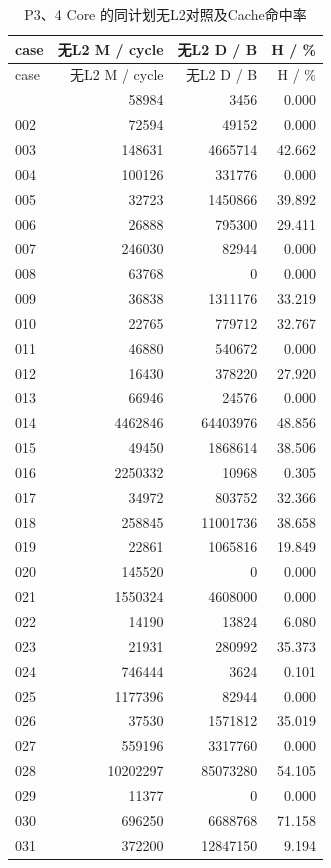 \documentclass[anonymous,notoc]{gmcm2026}
\begin{document}
\begin{longtable}{lrrr}
\caption{P3、4 Core 的同计划无L2对照及Cache命中率}\\
\toprule
case & 无L2 M / cycle & 无L2 D / B & H / \%\\\midrule
\endfirsthead
\toprule
case & 无L2 M / cycle & 无L2 D / B & H / \%\\\midrule
\endhead
\bottomrule\endfoot
001 & 58984 & 3456 & 0.000 \\
002 & 72594 & 49152 & 0.000 \\
003 & 148631 & 4665714 & 42.662 \\
004 & 100126 & 331776 & 0.000 \\
005 & 32723 & 1450866 & 39.892 \\
006 & 26888 & 795300 & 29.411 \\
007 & 246030 & 82944 & 0.000 \\
008 & 63768 & 0 & 0.000 \\
009 & 36838 & 1311176 & 33.219 \\
010 & 22765 & 779712 & 32.767 \\
011 & 46880 & 540672 & 0.000 \\
012 & 16430 & 378220 & 27.920 \\
013 & 66946 & 24576 & 0.000 \\
014 & 4462846 & 64403976 & 48.856 \\
015 & 49450 & 1868614 & 38.506 \\
016 & 2250332 & 10968 & 0.305 \\
017 & 34972 & 803752 & 32.366 \\
018 & 258845 & 11001736 & 38.658 \\
019 & 22861 & 1065816 & 19.849 \\
020 & 145520 & 0 & 0.000 \\
021 & 1550324 & 4608000 & 0.000 \\
022 & 14190 & 13824 & 6.080 \\
023 & 21931 & 280992 & 35.373 \\
024 & 746444 & 3624 & 0.101 \\
025 & 1177396 & 82944 & 0.000 \\
026 & 37530 & 1571812 & 35.019 \\
027 & 559196 & 3317760 & 0.000 \\
028 & 10202297 & 85073280 & 54.105 \\
029 & 11377 & 0 & 0.000 \\
030 & 696250 & 6688768 & 71.158 \\
031 & 372200 & 12847150 & 9.194 \\

\end{longtable}
\end{document}
